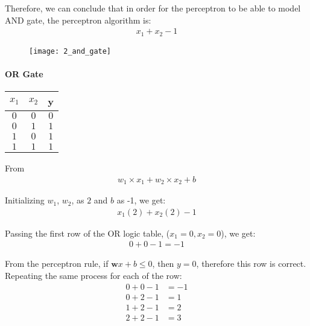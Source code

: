 Therefore, we can conclude that in order for the perceptron to be able to model AND gate, the perceptron algorithm is:
\begin{align}
	x_1 + x_2 - 1
\end{align}

\begin{figure}[H]
	\centering
	\texttt{[image: 2\_and\_gate]}
\end{figure}

\paragraph{OR Gate}

\begin{flushleft}
	\begin{table}[H]
		\centering
		\begin{tabular}{|c|c|c|}
			\hline
			$x_1$ & $x_2$ & y \\
			\hline
			$0$ & $0$ & $0$   \\
			$0$ & $1$ & $1$   \\
			$1$ & $0$ & $1$   \\
			$1$ & $1$ & $1$   \\
			\hline
		\end{tabular}
	\end{table}
\end{flushleft}

From 
\begin{align}
	w_1\times x_1 + w_2\times x_2 + b
\end{align}

Initializing $w_1$, $w_2$, as $2$ and $b$ as -1, we get:
\begin{align}
	x_1(2) + x_2(2) - 1
\end{align}

Passing the first row of the OR logic table, ($x_1 = 0, x_2 = 0$), we get:
\begin{align}
	0 + 0 - 1 = -1
\end{align}

From the perceptron rule, if $\mathbf{w}x + b \leq 0$, then $y=0$, therefore this row is correct. Repeating the same process for each of the row:
\begin{align*}
	0 + 0 - 1 &= -1 \\
	0 + 2 - 1 &= 1 \\
	1 + 2 - 1 &= 2 \\
	2 + 2 - 1 &= 3 \\
\end{align*}

